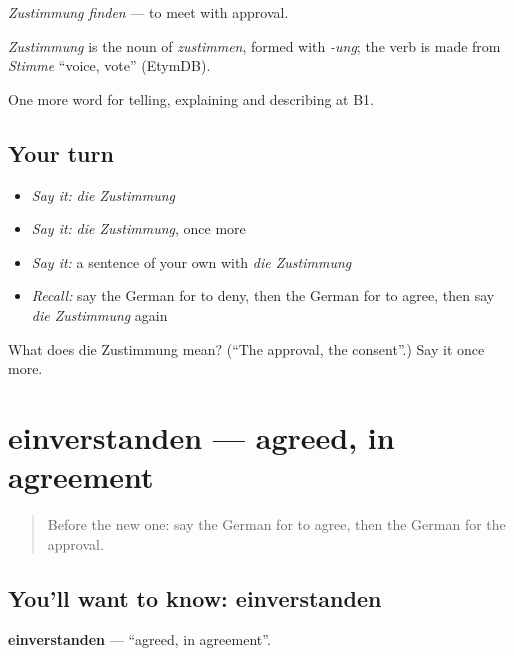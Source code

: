 \emph{Zustimmung finden} — to meet with approval.

\begin{cousinweb}
\emph{Zustimmung} is the noun of \emph{zustimmen}, formed with \emph{-ung}; the verb is made from \emph{Stimme} \textquotedblleft{}voice, vote\textquotedblright{} (EtymDB).
\end{cousinweb}

\begin{grammarlens}[title={What you've built}]
One more word for telling, explaining and describing at B1.
\end{grammarlens}

\subsection*{Your turn}
\begin{itemize}
\raggedright
  \item \emph{Say it:} \emph{die Zustimmung}
  \item \emph{Say it:} \emph{die Zustimmung}, once more
  \item \emph{Say it:} a sentence of your own with \emph{die Zustimmung}
  \item \emph{Recall:} say the German for to deny, then the German for to agree, then say \emph{die Zustimmung} again
\end{itemize}

\begin{tcolorbox}[breakable,colback=teal!4,colframe=teal!35!black,title={Before you move on}]
What does die Zustimmung mean? (\textquotedblleft{}The approval, the consent\textquotedblright{}.) Say it once more.
\end{tcolorbox}
\section[einverstanden]{einverstanden — agreed, in agreement}

\label{lesson:GE-C334-einverstanden}



\begin{quote}
Before the new one: say the German for to agree, then the German for the approval.
\end{quote}

\subsection*{You'll want to know: einverstanden}
\textbf{einverstanden} — \textquotedblleft{}agreed, in agreement\textquotedblright{}.

